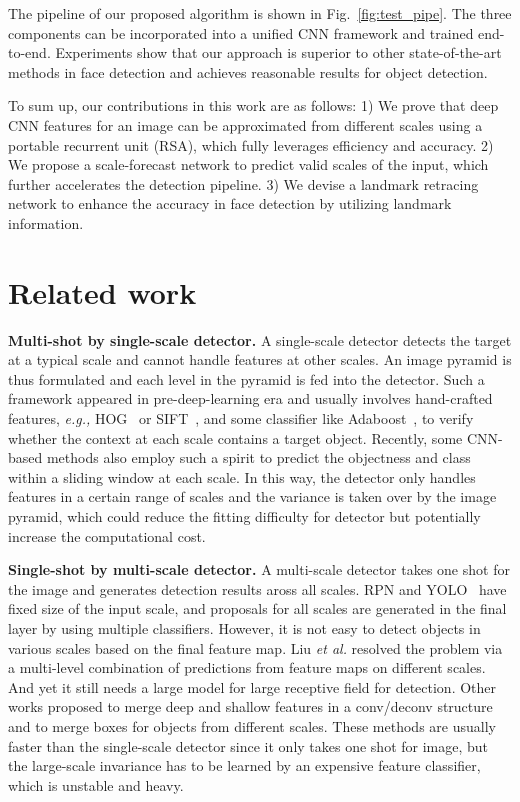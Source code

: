 \documentclass[10pt,twocolumn,letterpaper]{article}
\begin{document}
The pipeline of our proposed algorithm 
is shown in Fig.~\ref{fig:test_pipe}.
The three components can be incorporated into a unified CNN framework and trained end-to-end.
Experiments show that our approach is superior to other state-of-the-art methods in face detection and achieves reasonable results for object detection. 


To sum up, our contributions in this work are as follows: 1) We prove that deep CNN features for an image can be approximated from different scales using a portable recurrent unit (RSA), which fully leverages efficiency and accuracy. 2) We propose a scale-forecast network to predict valid scales of the input, which further accelerates the detection pipeline. 3) We devise a landmark retracing network to enhance the accuracy in face detection by utilizing landmark information.

\vspace{-0.3cm}
\section{Related work}
\textbf{Multi-shot by single-scale detector.} 
A single-scale detector detects the target at a typical scale and cannot handle features at other scales. 
An image pyramid is thus formulated and each level in the pyramid is fed  into  the detector.
Such a framework appeared in pre-deep-learning  era \cite{Felzenszwalb2010Cascade,chen2014joint} and usually involves hand-crafted features, \textit{e.g.,}  
HOG~\cite{Dalal2005Histograms} or SIFT~\cite{lowe2004distinctive},
and some classifier like Adaboost~\cite{viola2004robust}, to verify whether the context at each scale contains a target object. 
Recently, 
some CNN-based methods \cite{li2015convolutional,overfeat} also employ such a spirit to
predict the objectness and class within a sliding window at each scale. 
In this way, the detector only handles features in a certain range of scales and the variance is taken over by the image pyramid, which could reduce the fitting difficulty for detector but potentially increase the computational cost.

\textbf{Single-shot by multi-scale detector.} 
A multi-scale detector takes one shot for the image and generates detection results aross all scales.
RPN \cite{faster_rcnn} and YOLO~\cite{redmon2016you} have fixed size of the input scale, and proposals for all scales are generated in the final layer by using multiple classifiers. 
However,  it is not easy to detect  objects in various scales based on the final feature map.
Liu \textit{et al.} \cite{liu2016ssd} resolved the problem via a multi-level combination of predictions from  feature maps on 
different scales.
And yet it still needs a large model for large receptive field for detection. 
Other works \cite{lin2016feature,li2017zoom}
proposed to merge deep and shallow features in a conv/deconv structure and 
to merge boxes for objects from different scales.
These methods are usually faster than the single-scale detector since it only takes one shot for image, but the large-scale invariance  has to be learned by an expensive feature classifier, which is unstable and heavy.
\end{document}
